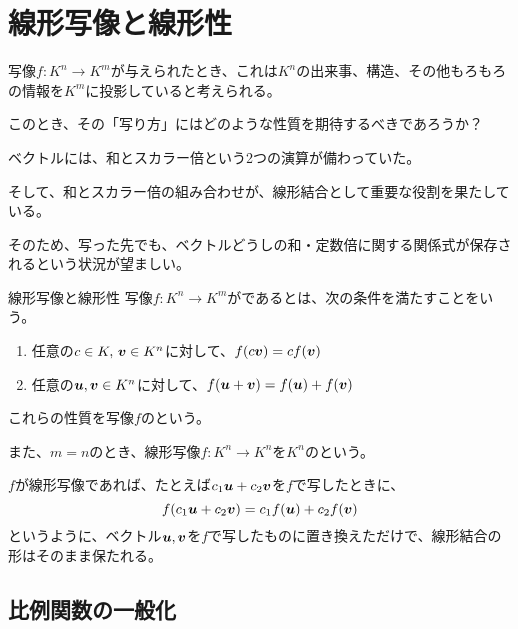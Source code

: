 \documentclass[../../../topic_linear-algebra]{subfiles}
\begin{document}
\sectionline
\section{線形写像と線形性}

写像$f \colon K^n \to K^m$が与えられたとき、これは$K^n$の出来事、構造、その他もろもろの情報を$K^m$に投影していると考えられる。

このとき、その「写り方」にはどのような性質を期待するべきであろうか？

\br

ベクトルには、和とスカラー倍という2つの演算が備わっていた。

そして、和とスカラー倍の組み合わせが、線形結合として重要な役割を果たしている。

\br

そのため、写った先でも、ベクトルどうしの和・定数倍に関する関係式が保存されるという状況が望ましい。

\begin{definition*}{線形写像と線形性}
  写像$f\colon K^n \to K^m$がであるとは、次の条件を満たすことをいう。
  \begin{enumerate}[label=\romanlabel]
    \item 任意の$c \in K , \, \vb*{v} \in K^n$に対して、$f(c\vb*{v}) = cf(\vb*{v})$
    \item 任意の$\vb*{u}, \vb*{v} \in K^n$に対して、$f(\vb*{u} + \vb*{v}) = f(\vb*{u}) + f(\vb*{v})$
  \end{enumerate}
  これらの性質を写像$f$のという。

  また、$m=n$のとき、線形写像$f\colon K^n \to K^n$を$K^n$のという。
\end{definition*}

$f$が線形写像であれば、たとえば$c_1 \vb*{u} + c_2 \vb*{v}$を$f$で写したときに、
\begin{equation*}
  f(c_1 \vb*{u} + c_2 \vb*{v}) = c_1 f(\vb*{u}) + c_2 f(\vb*{v})
\end{equation*}
というように、ベクトル$\vb*{u},\vb*{v}$を$f$で写したものに置き換えただけで、線形結合の形はそのまま保たれる。

\subsection{比例関数の一般化}
\end{document}
